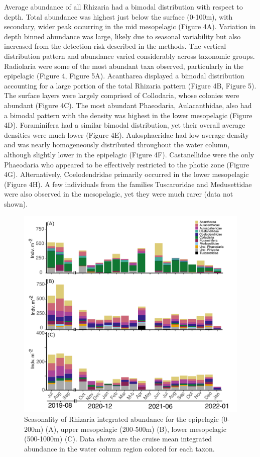 \documentclass[
]{article}
\begin{document}
Average abundance of all Rhizaria had a bimodal distribution with
respect to depth. Total abundance was highest just below the surface
(0-100m), with secondary, wider peak occurring in the mid mesopelagic
(Figure 4A). Variation in depth binned abundance was large, likely due
to seasonal variability but also increased from the detection-risk
described in the methods. The vertical distribution pattern and
abundance varied considerably across taxonomic groups. Radiolaria were
some of the most abundant taxa observed, particularly in the epipelagic
(Figure 4, Figure 5A). Acantharea displayed a bimodal distribution
accounting for a large portion of the total Rhizaria pattern (Figure 4B,
Figure 5). The surface layers were largely comprised of Collodaria,
whose colonies were abundant (Figure 4C). The most abundant Phaeodaria,
Aulacanthidae, also had a bimodal pattern with the density was highest
in the lower mesopelagic (Figure 4D). Foraminifera had a similar bimodal
distribution, yet their overall average densities were much lower
(Figure 4E). Aulosphaeridae had low average density and was nearly
homogeneously distributed throughout the water column, although slightly
lower in the epipelagic (Figure 4F). Castanellidae were the only
Phaeodaria who appeared to be effectively restricted to the photic zone
(Figure 4G). Alternatively, Coelodendridae primarily occurred in the
lower mesopelagic (Figure 4H). A few individuals from the families
Tuscaroridae and Medusettidae were also observed in the mesopelagic, yet
they were much rarer (data not shown).

\begin{figure}[H]

{\centering \includegraphics{images/05_seasonality.pdf}

}

\caption{Seasonality of Rhizaria integrated abundance for the epipelagic
(0-200m) (A), upper mesopelagic (200-500m) (B), lower mesopelagic
(500-1000m) (C). Data shown are the cruise mean integrated abundance in
the water column region colored for each taxon.}

\end{figure}%
\end{document}
